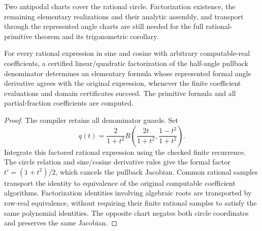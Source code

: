 Two antipodal charts cover the rational circle. Factorization existence,
the remaining elementary realizations and their analytic assembly,
and transport through the represented angle charts are still needed for the
full rational-primitive theorem and its trigonometric corollary.

\begin{theorem}
\label{thm:trigonometric-primitive-formula}
\leanok
For every rational expression in sine and cosine with arbitrary computable-real
coefficients, a certified linear/quadratic factorization of the half-angle
pullback denominator determines an elementary formula whose represented formal
angle derivative agrees with the original expression, whenever the finite
coefficient evaluations and domain certificates succeed. The primitive formula
and all partial-fraction coefficients are computed.
\end{theorem}
\begin{proof}\leanok
The compiler retains all denominator guards. Set
\[
 q(t)=\frac2{1+t^2}R\left(\frac{2t}{1+t^2},\frac{1-t^2}{1+t^2}\right).
\]
Integrate this factored rational expression using the checked finite recurrence.
The circle relation and sine/cosine derivative rules give the formal factor
$t'=(1+t^2)/2$, which cancels the pullback Jacobian. Common rational samples
transport the identity to equivalence of the original computable coefficient
algorithms. Factorization identities involving algebraic roots are transported
by raw-real equivalence, without requiring their finite rational samples to
satisfy the same polynomial identities. The opposite chart negates both circle coordinates and preserves
the same Jacobian.
\end{proof}

